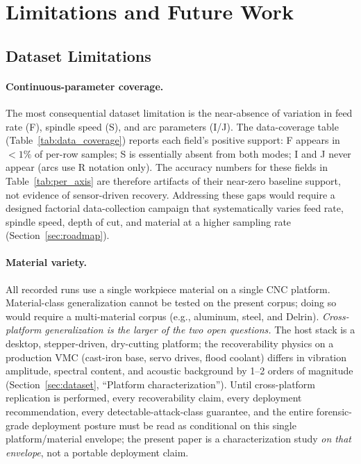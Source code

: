 \documentclass[sensors,article,submit,moreauthors,pdftex]{Definitions/mdpi}
\begin{document}
\section{Limitations and Future Work}
\label{sec:future}

\subsection{Dataset Limitations}
\label{sec:lim-dataset}

\paragraph{Continuous-parameter coverage.} The most consequential dataset limitation is the near-absence of variation in feed rate (F), spindle speed (S), and arc parameters (I/J). The data-coverage table (Table~\ref{tab:data_coverage}) reports each field's positive support: F appears in $<\!1\%$ of per-row samples; S is essentially absent from both modes; I and J never appear (arcs use R notation only). The accuracy numbers for these fields in Table~\ref{tab:per_axis} are therefore artifacts of their near-zero baseline support, not evidence of sensor-driven recovery. Addressing these gaps would require a designed factorial data-collection campaign that systematically varies feed rate, spindle speed, depth of cut, and material at a higher sampling rate (Section~\ref{sec:roadmap}).

\paragraph{Material variety.} All recorded runs use a single workpiece material on a single CNC platform. Material-class generalization cannot be tested on the present corpus; doing so would require a multi-material corpus (e.g., aluminum, steel, and Delrin). \emph{Cross-platform generalization is the larger of the two open questions.} The host stack is a desktop, stepper-driven, dry-cutting platform; the recoverability physics on a production VMC (cast-iron base, servo drives, flood coolant) differs in vibration amplitude, spectral content, and acoustic background by 1--2 orders of magnitude (Section~\ref{sec:dataset}, ``Platform characterization''). Until cross-platform replication is performed, every recoverability claim, every deployment recommendation, every detectable-attack-class guarantee, and the entire forensic-grade deployment posture must be read as conditional on this single platform/material envelope; the present paper is a characterization study \emph{on that envelope}, not a portable deployment claim.
\end{document}
